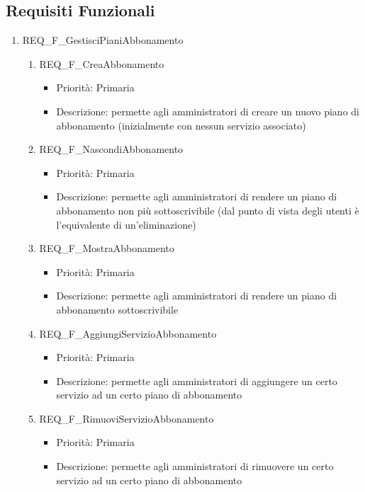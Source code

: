 \subsection{Requisiti Funzionali}
\begin{enumerate}
	

	\item REQ\_F\_GestisciPianiAbbonamento
		\begin{enumerate}[label*=\arabic*.]      
		\item REQ\_F\_CreaAbbonamento
			\begin{itemize}	
			\item Priorità: Primaria
			\item Descrizione: permette agli amministratori di creare un nuovo piano di abbonamento (inizialmente con nessun servizio associato)
			\end{itemize}
		\item REQ\_F\_NascondiAbbonamento
			\begin{itemize}	
			\item Priorità: Primaria
			\item Descrizione: permette agli amministratori di rendere un piano di abbonamento non più sottoscrivibile (dal punto di vista degli utenti è l'equivalente di un'eliminazione)
			\end{itemize}
		\item REQ\_F\_MostraAbbonamento
			\begin{itemize}
			\item Priorità: Primaria
			\item Descrizione: permette agli amministratori di rendere un piano di abbonamento sottoscrivibile
			\end{itemize}
		\item REQ\_F\_AggiungiServizioAbbonamento
			\begin{itemize}	
			\item Priorità: Primaria
			\item Descrizione: permette agli amministratori di aggiungere un certo servizio ad un certo piano di abbonamento
			\end{itemize}
	
		\item REQ\_F\_RimuoviServizioAbbonamento
			\begin{itemize}	
			\item Priorità: Primaria
			\item Descrizione: permette agli amministratori di rimuovere un certo servizio ad un certo piano di abbonamento
			\end{itemize}


\end{enumerate}
\end{enumerate}
